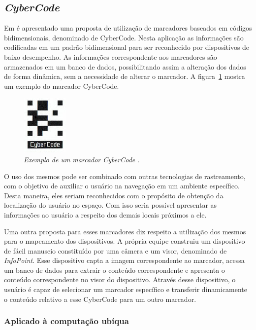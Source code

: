 \subsection{\textit{CyberCode}}
\label{sec:cybercode}
	
	Em \cite{rekimoto} é apresentado uma proposta de utilização de marcadores baseados em códigos
	bidimensionais, denominado de CyberCode. Nesta aplicação as informações são codificadas em um
	padrão bidimensional para ser reconhecido por dispositivos de baixo desempenho. As informações
	correspondente aos marcadores são armazenados em um banco de dados, possibilitando assim a
	alteração dos dados de forma dinâmica, sem a necessidade de alterar o marcador. A
	figura~\ref{fig:cybercode} mostra um exemplo do marcador CyberCode.
	
	\begin{figure}[htb]
		\centering \includegraphics[scale=1]{figuras/cap2/cybercode.png}
		\caption{\textit{Exemplo de um marcador CyberCode \cite{rekimoto}.}}
		\label{fig:cybercode} 
	\end{figure} 
	 
	O uso dos mesmos pode ser combinado com outras tecnologias de rastreamento, com o objetivo de
	auxiliar o usuário na navegação em um ambiente específico. Desta maneira, eles seriam
	reconhecidos com o propósito de obtenção da localização do usuário no espaço. Com isso seria
	possível apresentar as informações ao usuário a respeito dos demais locais próximos a ele.
	
	Uma outra proposta para esses marcadores diz respeito a utilização dos mesmos para o mapeamento dos
	dispositivos. A própria equipe construiu um dispositivo de fácil manuseio constituído por uma
	câmera e um visor, denominado de \textit{InfoPoint}. Esse dispositivo capta a imagem correspondente
	ao marcador, acessa um banco de dados para extrair o conteúdo correspondente e apresenta o conteúdo
	correspondente no visor do dispositivo. Através desse dispositivo, o usuário é capaz de selecionar
	um marcador específico e transferir dinamicamente o conteúdo relativo a esse CyberCode para um outro
	marcador.
	
	\subsubsection{Aplicado à computação ubíqua}
	 
